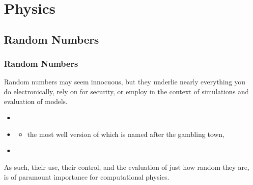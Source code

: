 \documentclass[hyperref={colorlinks=true}]{beamer}
\begin{document}
\section[Physics]{Physics}

\subsection[Random Numbers]{Random Numbers}

\begin{frame}%
  \frametitle{Random Numbers}
  
  Random numbers may seem innocuous, but they underlie nearly everything you do electronically, rely on for security, or employ in the context of simulations and evaluation of models.
  
  \begin{itemize}
    \item {}
    \item {}
    \begin{itemize}
      \item the most well version of which is named after the gambling town, 
    \end{itemize}
    \item {}
  \end{itemize}

  As such, their use, their control, and the evaluation of just how random they are, is of paramount importance for computational physics.

\end{frame}

\end{document}
